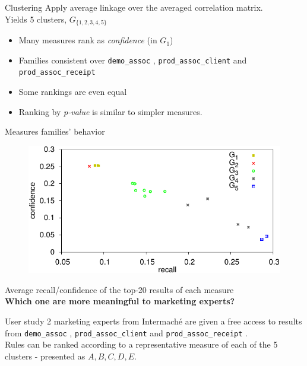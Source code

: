 \documentclass[table]{beamer}
\providecommand{\demoassoc}{\texttt{demo\-\_assoc} }
\providecommand{\prodassocreceipt}{\texttt{prod\-\_assoc\-\_receipt} }
\providecommand{\prodassocclient}{\texttt{prod\-\_assoc\-\_client} }
\begin{document}
\begin{frame}{Clustering}
  Apply average linkage over the averaged correlation matrix.\\
  \vspace{1cm}
  \pause
  Yields 5 clusters, $G_{\{1,2,3,4,5\}}$
  \begin{itemize}
    \item Many measures rank as {\em confidence} (in $G_1$)
    \item Families consistent over \demoassoc, \prodassocclient and \prodassocreceipt
    \item Some rankings are even equal
    \item Ranking by {\em p-value} is similar to simpler measures.
  \end{itemize}
\end{frame}


\begin{frame}{Measures families' behavior}
  \centering
  \begin{figure}
    \includegraphics{../fig/capa/recall_precision.pdf}
  \end{figure}
  Average recall/confidence of the top-20 results of each measure\\\vspace{1cm}
  \pause
  {\bf Which one are more meaningful to marketing experts?}
\end{frame}

\begin{frame}{User study}
  2 marketing experts from Intermach\'e are given a free access to results from
  \demoassoc, \prodassocclient and \prodassocreceipt.\\
  \vspace{1cm}
  Rules can be ranked according to a representative measure of each of the 5
  clusters - presented as ${A,B,C,D,E}$.\\
\end{frame}
\end{document}
